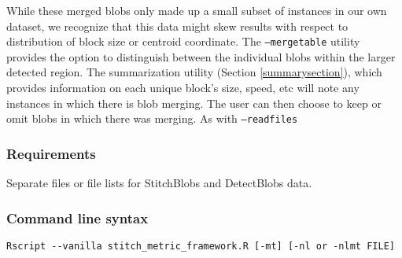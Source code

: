 \documentclass{article}
\begin{document}

While these merged blobs only made up a small subset of instances in our own dataset, we recognize that this data might skew results with respect to distribution of block size or centroid coordinate. The \texttt{--mergetable} utility provides the option to distinguish between the individual blobs within the larger detected region. The summarization utility (Section \ref{summarysection}), which provides information on each unique block's size, speed, etc will note any instances in which there is blob merging. The user can then choose to keep or omit blobs in which there was merging. As with \texttt{--readfiles}

\subsubsection{Requirements}
Separate files or file lists for StitchBlobs and DetectBlobs data. %

\subsubsection{Command line syntax}
\begin{verbatim}
Rscript --vanilla stitch_metric_framework.R [-mt] [-nl or -nlmt FILE]
\end{verbatim}
\end{document}
